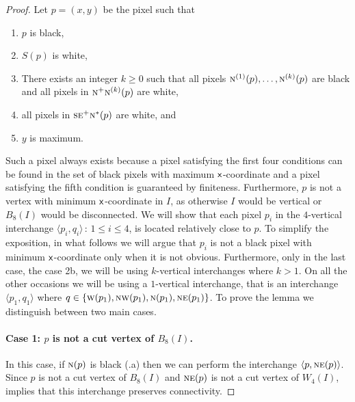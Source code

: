 \documentclass[lotsofwhite,charterfonts]{patmorin}
\newcommand{\N}{\textsc{n}}
\newcommand{\NE}{\textsc{ne}}
\newcommand{\E}{\textsc{e}}
\renewcommand{\S}{\textsc{s}}
\newcommand{\W}{\textsc{w}}
\newcommand{\NW}{\textsc{nw}}
\newcommand{\x}{\ensuremath{\protect\textup{\textsf{x}}}}
\newcommand{\ic}[2]{\langle #1,#2 \rangle}
\begin{document}
\begin{proof}
Let $p=(x,y)$ be the pixel such that
\begin{enumerate}
  \item $p$ is black, 
  \item $S(p)$ is white,
  \item There exists an integer $k\ge 0$ such that all pixels
	$\N^{(1)}(p),\ldots,\N^{(k)}(p)$ are black and 
        all pixels in $\N^{+}\N^{(k)}(p)$ are white,
  \item all pixels in $\S\E^+\N^*(p)$ are white, and
  \item $y$ is maximum.
\end{enumerate}
Such a pixel always exists because a pixel satisfying the first four conditions can be found in the set of black pixels with maximum \x-coordinate and a pixel satisfying the fifth condition is guaranteed by finiteness. Furthermore, $p$ is not a vertex with minimum \x-coordinate in $I$, as otherwise $I$ would be vertical or $B_8(I)$ would be disconnected. We will show that each pixel $p_i$ in the $4$-vertical interchange $\ic{p_i}{q_i}\, :\,1\leq i\leq 4$, is located relatively close to $p$. To simplify the exposition, in what follows we will argue that $p_i$ is not a black pixel with minimum \x-coordinate only when it is not obvious. Furthermore, only in the last case, the case 2b, we will be using $k$-vertical interchanges where $k>1$. On all the other occasions we will be using a $1$-vertical interchange, that is an interchange $\ic{p_1}{q_1}$ where $q\in\{\W(p_1),\NW(p_1),\N(p_1),\NE(p_1)\}$. To prove the lemma we distinguish between two main cases.

\paragraph{Case 1: $p$ is not a cut vertex of $B_8(I)$.} 

In this case, if $\N(p)$ is black (.a) then we can perform
the interchange $\ic{p}{\NE(p)}$.  Since $p$ is not a cut vertex of
$B_8(I)$ and $\NE(p)$ is not a cut vertex of $W_4(I)$,
 implies that this interchange preserves
connectivity.



\end{proof}
\end{document}
